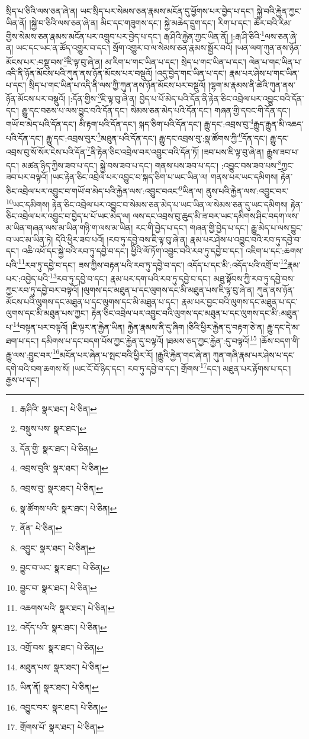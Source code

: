 སྲིད་པ་ཅིའི་ལས་ཅན་ཞེ་ན། ཡང་སྲིད་པར་སེམས་ཅན་རྣམས་མངོན་དུ་ཕྱོགས་པར་བྱེད་པ་དང་། སྐྱེ་བའི་རྐྱེན་ཀྱང་ཡིན་ནོ། །སྐྱེ་བ་ཅིའི་ལས་ཅན་ཞེ་ན། མིང་དང་གཟུགས་དང་། སྐྱེ་མཆེད་དྲུག་དང་། རིག་པ་དང་། ཚོར་བའི་རིམ་གྱིས་སེམས་ཅན་རྣམས་མངོན་པར་འགྲུབ་པར་བྱེད་པ་དང་། རྒ་ཤིའི་རྐྱེན་ཀྱང་ཡིན་ནོ། །:རྒ་ཤི་ཅིའི་\footnote{རྒ་ཤིའི་  སྣར་ཐང་།  པེ་ཅིན། }ལས་ཅན་ཞེ་ན། ཡང་དང་ཡང་ན་ཚོད་འགྱུར་བ་དང་། སྲོག་འགྱུར་བ་ལ་སེམས་ཅན་རྣམས་སྦྱོར་བའོ། །ཡན་ལག་ཀུན་ནས་ཉོན་མོངས་པར་:བསྡུ་བས་\footnote{བསྡུས་པས་  སྣར་ཐང་། }ཇི་ལྟ་བུ་ཞེ་ན། མ་རིག་པ་གང་ཡིན་པ་དང་། སྲེད་པ་གང་ཡིན་པ་དང་། ལེན་པ་གང་ཡིན་པ་འདི་ནི་ཉོན་མོངས་པའི་ཀུན་ནས་ཉོན་མོངས་པར་བསྡུའོ། །འདུ་བྱེད་གང་ཡིན་པ་དང་། རྣམ་པར་ཤེས་པ་གང་ཡིན་པ་དང་། སྲིད་པ་གང་ཡིན་པ་འདི་ནི་ལས་ཀྱི་ཀུན་ནས་ཉོན་མོངས་པར་བསྡུའོ། །ལྷག་མ་རྣམས་ནི་ཚེའི་ཀུན་ནས་ཉོན་མོངས་པར་བསྡུའོ། །:དོན་གྱིས་\footnote{དོན་གྱི་  སྣར་ཐང་།  པེ་ཅིན། }ཇི་ལྟ་བུ་ཞེ་ན། བྱེད་པ་པོ་མེད་པའི་དོན་ནི་རྟེན་ཅིང་འབྲེལ་པར་འབྱུང་བའི་དོན་དང་། རྒྱུ་དང་བཅས་པ་ལས་བྱུང་བའི་དོན་དང་། སེམས་ཅན་མེད་པའི་དོན་དང་། གཞན་གྱི་དབང་གི་དོན་དང་། གཡོ་བ་མེད་པའི་དོན་དང་། མི་རྟག་པའི་དོན་དང་། སྐད་ཅིག་པའི་དོན་དང་། རྒྱུ་དང་:འབྲས་བུ་\footnote{འབྲས་བུའི་  སྣར་ཐང་།  པེ་ཅིན། }རྒྱུད་རྒྱུན་མི་འཆད་པའི་དོན་དང་། རྒྱུ་དང་:འབྲས་བུར་\footnote{འབྲས་བུ་  སྣར་ཐང་།  པེ་ཅིན། }མཐུན་པའི་དོན་དང་། རྒྱུ་དང་འབྲས་བུ་:སྣ་ཚོགས་ཀྱི་\footnote{སྣ་ཚོགས་པའི་  སྣར་ཐང་།  པེ་ཅིན། }དོན་དང་། རྒྱུ་དང་འབྲས་བུ་སོ་སོར་ངེས་པའི་དོན་\footnote{ནོན་  པེ་ཅིན། }ནི་རྟེན་ཅིང་འབྲེལ་བར་འབྱུང་བའི་དོན་ཏོ། །ཟབ་པས་ཇི་ལྟ་བུ་ཞེ་ན། རྒྱུས་ཟབ་པ་དང་། མཚན་ཉིད་ཀྱིས་ཟབ་པ་དང་། སྐྱེ་བས་ཟབ་པ་དང་། གནས་པས་ཟབ་པ་དང་། :འབྱུང་བས་ཟབ་པས་\footnote{འབྱུང་  སྣར་ཐང་།  པེ་ཅིན། }ཀྱང་ཟབ་པར་བལྟའོ། །ཡང་རྟེན་ཅིང་འབྲེལ་པར་འབྱུང་བ་སྐད་ཅིག་པ་ཡང་ཡིན་ལ། གནས་པར་ཡང་དམིགས། རྟེན་ཅིང་འབྲེལ་པར་འབྱུང་བ་གཡོ་བ་མེད་པའི་རྐྱེན་ལས་:འབྱུང་བའང་\footnote{བྱུང་བ་ཡང་  སྣར་ཐང་།  པེ་ཅིན། }ཡིན་ལ། ནུས་པའི་རྐྱེན་ལས་:འབྱུང་བར་\footnote{བྱུང་བ་  སྣར་ཐང་།  པེ་ཅིན། }ཡང་དམིགས། རྟེན་ཅིང་འབྲེལ་པར་འབྱུང་བ་སེམས་ཅན་མེད་པ་ཡང་ཡིན་ལ་སེམས་ཅན་དུ་ཡང་དམིགས། རྟེན་ཅིང་འབྲེལ་པར་འབྱུང་བ་བྱེད་པ་པོ་ཡང་མེད་ལ། ལས་དང་འབྲས་བུ་ཆུད་མི་ཟ་བར་ཡང་དམིགས་ཤིང་བདག་ལས་མ་ཡིན་གཞན་ལས་མ་ཡིན་གཉི་ག་ལས་མ་ཡིན། རང་གི་བྱེད་པ་དང་། གཞན་གྱི་བྱེད་པ་དང་། རྒྱུ་མེད་པ་ལས་བྱུང་བ་ཡང་མ་ཡིན་ཏེ། དེའི་ཕྱིར་ཟབ་པའོ། །རབ་ཏུ་དབྱེ་བས་ཇི་ལྟ་བུ་ཞེ་ན། རྣམ་པར་ཤེས་པ་འབྱུང་བའི་རབ་ཏུ་དབྱེ་བ་དང་། འཆི་འཕོ་དང་སྐྱེ་བའི་རབ་ཏུ་དབྱེ་བ་དང་། ཕྱིའི་ལོ་ཏོག་འབྱུང་བའི་རབ་ཏུ་དབྱེ་བ་དང་། འཇིག་པ་དང་:ཆགས་པའི་\footnote{འཆགས་པའི་  སྣར་ཐང་།  པེ་ཅིན། }རབ་ཏུ་དབྱེ་བ་དང་། ཟས་ཀྱིས་བརྟན་པའི་རབ་ཏུ་དབྱེ་བ་དང་། འདོད་པ་དང་མི་:འདོད་པའི་འགྲོ་བ་\footnote{འདོད་པའི་  སྣར་ཐང་།  པེ་ཅིན། }རྣམ་པར་:འབྱེད་པའི་\footnote{འགྲོ་བས་  སྣར་ཐང་།  པེ་ཅིན། }རབ་ཏུ་དབྱེ་བ་དང་། རྣམ་པར་དག་པའི་རབ་ཏུ་དབྱེ་བ་དང་། མཐུ་སྟོབས་ཀྱི་རབ་ཏུ་དབྱེ་བས་ཀྱང་རབ་ཏུ་དབྱེ་བར་བལྟའོ། །ལུགས་དང་མཐུན་པ་དང་ལུགས་དང་མི་མཐུན་པས་ཇི་ལྟ་བུ་ཞེ་ན། ཀུན་ནས་ཉོན་མོངས་པའི་ལུགས་དང་མཐུན་པ་དང་ལུགས་དང་མི་མཐུན་པ་དང་། རྣམ་པར་བྱང་བའི་ལུགས་དང་མཐུན་པ་དང་ལུགས་དང་མི་མཐུན་པས་ཀྱང་། རྟེན་ཅིང་འབྲེལ་པར་འབྱུང་བའི་ལུགས་དང་མཐུན་པ་དང་ལུགས་དང་མི་:མཐུན་པ་\footnote{མཐུན་པས་  སྣར་ཐང་།  པེ་ཅིན། }བསྟན་པར་བལྟའོ། །ཇི་ལྟར་ན་རྐྱེན་ཡིན། རྐྱེན་རྣམས་ནི་དུ་ཞིག །ཅིའི་ཕྱིར་རྐྱེན་དུ་བརྟག་ཅེ་ན། རྒྱུ་དང་དེ་མ་ཐག་པ་དང་། དམིགས་པ་དང་བདག་པོས་ཀྱང་རྐྱེན་དུ་བལྟའོ། །ཐམས་ཅད་ཀྱང་རྐྱེན་:དུ་བལྟའོ།\footnote{ཡིན་ནོ།  སྣར་ཐང་།  པེ་ཅིན། } །ཆོས་བདག་གི་རྒྱུ་ལས་:བྱུང་བར་\footnote{འབྱུང་བར་  སྣར་ཐང་།  པེ་ཅིན། }མངོན་པར་ཞེན་པ་སྤང་བའི་ཕྱིར་རོ། །རྒྱུའི་རྐྱེན་གང་ཞེ་ན། ཀུན་གཞི་རྣམ་པར་ཤེས་པ་དང་དགེ་བའི་བག་ཆགས་སོ། །ཡང་ངོ་བོ་ཉིད་དང་། རབ་ཏུ་དབྱེ་བ་དང་། གྲོགས་\footnote{གྲོགས་པོ་  སྣར་ཐང་།  པེ་ཅིན། }དང་། མཐུན་པར་རྟོགས་པ་དང་། རྒྱས་པ་དང་། 